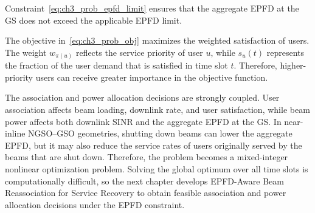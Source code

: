 Constraint~\eqref{eq:ch3_prob_epfd_limit} ensures that the aggregate EPFD at the GS does not exceed the applicable EPFD limit.

The objective in~\eqref{eq:ch3_prob_obj} maximizes the weighted satisfaction of users. The weight $w_{\pi(u)}$ reflects the service priority of user $u$, while $s_u(t)$ represents the fraction of the user demand that is satisfied in time slot $t$. Therefore, higher-priority users can receive greater importance in the objective function.

The association and power allocation decisions are strongly coupled. User association affects beam loading, downlink rate, and user satisfaction, while beam power affects both downlink SINR and the aggregate EPFD at the GS. In near-inline NGSO--GSO geometries, shutting down beams can lower the aggregate EPFD, but it may also reduce the service rates of users originally served by the beams that are shut down. Therefore, the problem becomes a mixed-integer nonlinear optimization problem. Solving the global optimum over all time slots is computationally difficult, so the next chapter develops EPFD-Aware Beam Reassociation for Service Recovery to obtain feasible association and power allocation decisions under the EPFD constraint.
